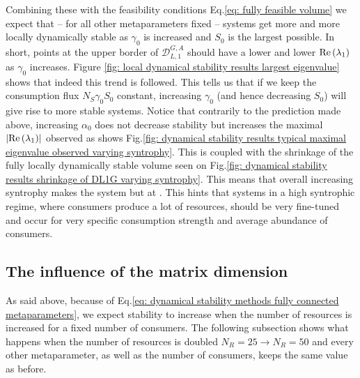 \documentclass[12pt, titlepage]{report}
\begin{document}
Combining these with the feasibility conditions Eq.\eqref{eq: fully feasible volume} we expect that -- for all other metaparameters fixed -- systems get more and more locally dynamically stable as $\gamma_0$ is increased and $S_0$ is the largest possible. In short, points at the upper border of $\mathcal{D}^{G,A}_{L,1}$ should have a lower and lower $\text{Re}\left(\lambda_1\right)$ as $\gamma_0$ increases. Figure \ref{fig: local dynamical stability results largest eigenvalue} shows that indeed this trend is followed.
This tells us that if we keep the consumption flux $N_S \gamma_0 S_0$ constant, increasing $\gamma_0$ (and hence decreasing $S_0$) will give rise to more stable systems. Notice that contrarily to the prediction made above, increasing $\alpha_0$ does not decrease stability but increases the maximal $\left|{\text{Re}\left(\lambda_1\right)}\right|$ observed as shows Fig.\ref{fig: dynamical stability results typical maximal eigenvalue observed varying syntrophy}. This is coupled with the shrinkage of the fully locally dynamically stable volume seen on Fig.\ref{fig: dynamical stability results shrinkage of DL1G varying syntrophy}. This means that overall increasing syntrophy makes the system  but at . This hints that systems in a high syntrophic regime, where consumers produce a lot of resources, should be very fine-tuned and occur for very specific consumption strength and average abundance of consumers.


\subsection{The influence of the matrix dimension}
As said above, because of Eq.\eqref{eq: dynamical stability methods fully connected metaparameters}, we expect stability to increase when the number of resources is increased for a fixed number of consumers. The following subsection shows what happens when the number of resources is doubled $N_R=25 \rightarrow N_R=50$ and every other metaparameter, as well as the number of consumers, keeps the same value as before.
\end{document}
